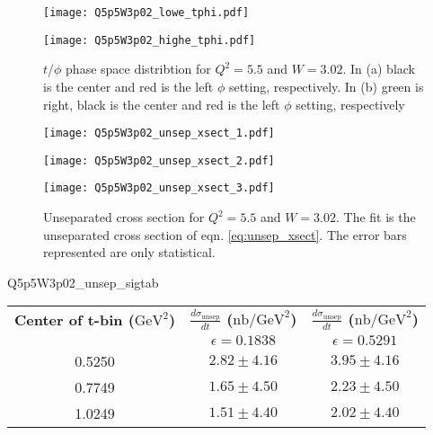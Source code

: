 \clearpage


\begin{figure}
  \centering
  \begin{minipage}[b]{0.48\linewidth}
    \texttt{[image: Q5p5W3p02\_lowe\_tphi.pdf]}
  \end{minipage}
  \begin{minipage}[b]{0.48\linewidth}
    \texttt{[image: Q5p5W3p02\_highe\_tphi.pdf]}
  \end{minipage}  
  \caption{$t$/$\phi$ phase space distribtion for $Q^2=5.5$ and $W=3.02$. In (a) black is the center and red is the left $\phi$ setting, respectively. In (b) green is right, black is the center and red is the left $\phi$ setting, respectively}
  \label{fig:Q5p5W3p02_tphi}
\end{figure}

\begin{figure}
  \centering
    \begin{minipage}[b]{0.48\linewidth}
      \texttt{[image: Q5p5W3p02\_unsep\_xsect\_1.pdf]}
    \end{minipage}
    \hfill
    \begin{minipage}[b]{0.48\linewidth}
      \texttt{[image: Q5p5W3p02\_unsep\_xsect\_2.pdf]}
    \end{minipage}
    \begin{minipage}[b]{0.48\linewidth}
      \texttt{[image: Q5p5W3p02\_unsep\_xsect\_3.pdf]}
    \end{minipage}
  \caption{Unseparated cross section for $Q^2=5.5$ and $W=3.02$. The fit is the unseparated cross section of eqn. \ref{eq:unsep_xsect}. The error bars represented are only statistical.}
  \label{fig:Q5p5W3p02_unsep_xsect}
\end{figure}

\begin{Mtable}{Q5p5W3p02_unsep_sigtab}
  \centering
  \begin{tabular}{|c|c|c|}
    \hline
    \textbf{Center of t-bin ($\mathrm{GeV}^2$)} & \textbf{$\frac{d\sigma_{\mathrm{unsep}}}{dt}$ ($\mathrm{nb/GeV}^2$)} & \textbf{$\frac{d\sigma_{\mathrm{unsep}}}{dt}$ ($\mathrm{nb/GeV}^2$)} \\
    & $\epsilon=0.1838$ & $\epsilon=0.5291$ \\
    \hline
    0.5250 & $2.82\pm4.16$ & $3.95\pm4.16$\\
    0.7749 & $1.65\pm4.50$ & $2.23\pm4.50$\\
    1.0249 & $1.51\pm4.40$ & $2.02\pm4.40$\\
    \hline
  \end{tabular}
  \caption{Unseparated cross section for $Q^2=5.5$ and $W=3.02$ for each $t$-bin. The range of $t$ was 0.400 to 1.150. The systematic errors are calculated using the modified PAC projections from table \ref{tab:7-1_pac_error}.}
  \label{tab:Q5p5W3p02_unsep_sigtab}
\end{Mtable}

